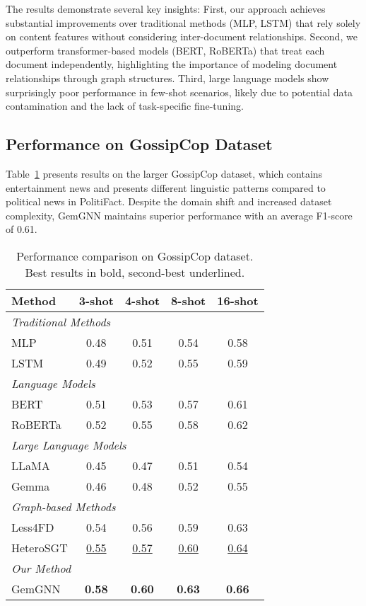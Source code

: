 The results demonstrate several key insights: First, our approach achieves substantial improvements over traditional methods (MLP, LSTM) that rely solely on content features without considering inter-document relationships. Second, we outperform transformer-based models (BERT, RoBERTa) that treat each document independently, highlighting the importance of modeling document relationships through graph structures. Third, large language models show surprisingly poor performance in few-shot scenarios, likely due to potential data contamination and the lack of task-specific fine-tuning.

\subsection{Performance on GossipCop Dataset}

Table~\ref{tab:results:gossipcop} presents results on the larger GossipCop dataset, which contains entertainment news and presents different linguistic patterns compared to political news in PolitiFact. Despite the domain shift and increased dataset complexity, GemGNN maintains superior performance with an average F1-score of 0.61.

\begin{table}[htbp]
\centering
\caption{Performance comparison on GossipCop dataset. Best results in bold, second-best underlined.}
\label{tab:results:gossipcop}
\begin{tabular}{lcccc}
\toprule
\textbf{Method} & \textbf{3-shot} & \textbf{4-shot} & \textbf{8-shot} & \textbf{16-shot} \\
\midrule
\multicolumn{5}{l}{\textit{Traditional Methods}} \\
MLP & 0.48 & 0.51 & 0.54 & 0.58 \\
LSTM & 0.49 & 0.52 & 0.55 & 0.59 \\
\midrule
\multicolumn{5}{l}{\textit{Language Models}} \\
BERT & 0.51 & 0.53 & 0.57 & 0.61 \\
RoBERTa & 0.52 & 0.55 & 0.58 & 0.62 \\
\midrule
\multicolumn{5}{l}{\textit{Large Language Models}} \\
LLaMA & 0.45 & 0.47 & 0.51 & 0.54 \\
Gemma & 0.46 & 0.48 & 0.52 & 0.55 \\
\midrule
\multicolumn{5}{l}{\textit{Graph-based Methods}} \\
Less4FD & 0.54 & 0.56 & 0.59 & 0.63 \\
HeteroSGT & \underline{0.55} & \underline{0.57} & \underline{0.60} & \underline{0.64} \\
\midrule
\multicolumn{5}{l}{\textit{Our Method}} \\
GemGNN & \textbf{0.58} & \textbf{0.60} & \textbf{0.63} & \textbf{0.66} \\
\bottomrule
\end{tabular}
\end{table}


